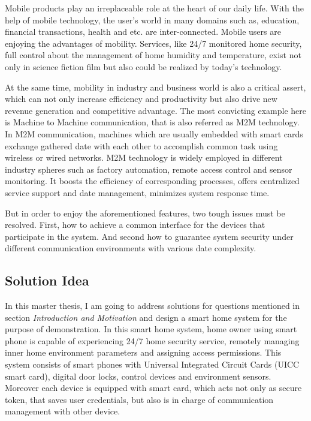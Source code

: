 \documentclass[]{llncs}
\begin{document}
Mobile products  play an irreplaceable role at the heart of our  daily life. With the help of mobile technology, the user's world in many domains such as, education, financial transactions, health and etc. are inter-connected. Mobile users are enjoying the advantages of mobility. Services, like 24/7 monitored home security, full control about the management of home humidity and temperature, exist not only in science fiction film but also could be realized by today's technology.

At the same time, mobility in industry and business world is also a critical  assert, which can not only increase efficiency and productivity but also drive new revenue generation and competitive advantage. The most convicting example here is Machine to Machine communication, that is also referred as M2M technology. In M2M communication, machines which are usually embedded with smart cards exchange gathered date with each other to accomplish common task using wireless or wired networks. M2M technology is widely employed in different industry spheres such as factory automation, remote access control and sensor monitoring. It boosts the efficiency of corresponding processes, offers centralized service support and date management, minimizes system response time.

But in order to enjoy the aforementioned features, two tough issues must be resolved. First, how to achieve a common interface for the devices that participate in the system.  And second how to guarantee system security under different communication environments with various date complexity.

\subsection{Solution Idea}
In this master thesis, I am going to address solutions for questions mentioned in  section \emph{Introduction and Motivation} and  design a smart home system for the purpose of demonstration. In this smart home system, home owner using smart phone is capable of experiencing 24/7 home security service, remotely managing inner home environment parameters and assigning access permissions. This system consists of smart phones with Universal Integrated Circuit Cards (UICC  smart card), digital door locks, control devices and environment sensors. Moreover each device is equipped with smart card, which acts not only as secure token, that saves  user credentials, but also is in charge of communication management with other device.
\end{document}
